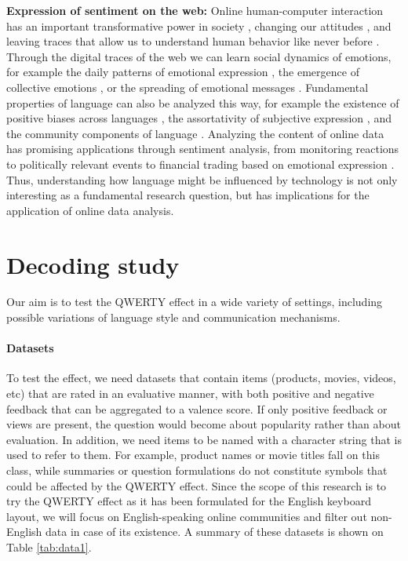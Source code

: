 \documentclass[letterpaper]{sig-alternate-2013}
\begin{document}
\textbf{Expression of sentiment on the web:} Online human-computer interaction
has an important transformative power in society \cite{Dimaggio2001}, changing
our attitudes \cite{Sassenberg2003}, and leaving traces that allow us to
understand human behavior like never before \cite{Golder2014}. Through the
digital traces of the web we can learn social dynamics of emotions, for
example the daily patterns of emotional expression \cite{Golder2011}, the
emergence of collective emotions \cite{Garas2012}, or the spreading of
emotional messages \cite{Alvarez2015}. Fundamental properties of
language can also be analyzed this way, for example the existence of positive
biases across languages \cite{Garcia2012,Dodds2015}, the assortativity of
subjective expression \cite{Bollen2011}, and the community components of
language \cite{Danescu2013,Bryden2013}. Analyzing the content of online data
has promising applications through sentiment analysis, from monitoring
reactions to politically relevant events \cite{Gonzalez2012} to financial
trading based on emotional expression \cite{Bollen2011b,Garcia2015}. Thus,
understanding how language might be influenced by technology is not only
interesting as a fundamental research question, but has implications for the
application of online data analysis.



\section{Decoding study}
Our aim is to test the QWERTY effect in a wide variety of
settings, including possible variations of language style and communication
mechanisms.
\paragraph{Datasets} To test the effect, we need datasets that contain items (products,
movies, videos, etc) that are rated in an evaluative manner, with both
positive and negative feedback that can be aggregated to a valence score. If
only positive feedback or views are present, the question would become about
popularity rather than about evaluation. In addition, we need items to be
named with a character string that is used to refer to them. For example,
product names or movie titles fall on this class, while summaries or question
formulations do not constitute symbols that could be affected by the QWERTY
effect. Since the scope of this research is to try the QWERTY effect as it has
been formulated for the English keyboard layout, we will focus on English-speaking online communities and filter out non-English data in case of its
existence. A summary of these datasets is shown on Table \ref{tab:data1}.
\end{document}

